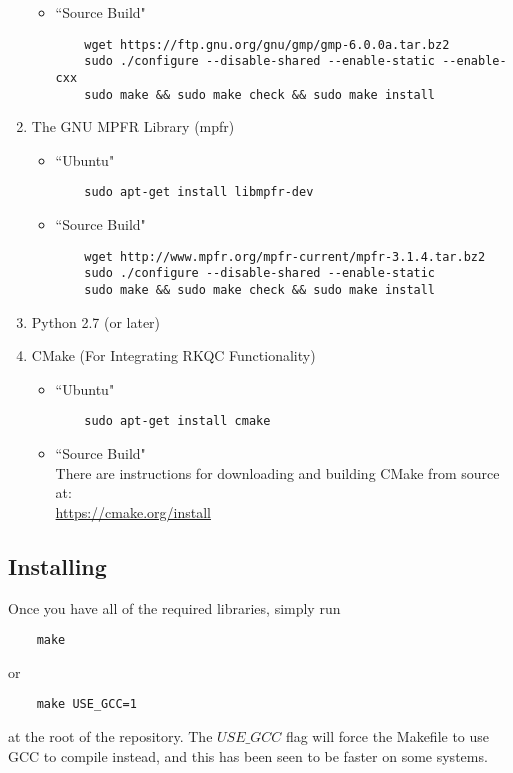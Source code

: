 \begin{enumerate}
\begin{itemize}
    \item ``Source Build"
    \begin{lstlisting}
    wget https://ftp.gnu.org/gnu/gmp/gmp-6.0.0a.tar.bz2
    sudo ./configure --disable-shared --enable-static --enable-cxx
    sudo make && sudo make check && sudo make install
    \end{lstlisting}
  \end{itemize}

  \item The GNU MPFR Library (mpfr)
  \begin{itemize}    
    \item ``Ubuntu"
    \begin{lstlisting}
    sudo apt-get install libmpfr-dev
    \end{lstlisting}

    \item ``Source Build"
    \begin{lstlisting}
    wget http://www.mpfr.org/mpfr-current/mpfr-3.1.4.tar.bz2
    sudo ./configure --disable-shared --enable-static
    sudo make && sudo make check && sudo make install
    \end{lstlisting}
  \end{itemize}

  \item Python 2.7 (or later)

  \item CMake (For Integrating RKQC Functionality)
  \begin{itemize}
    \item ``Ubuntu"
    \begin{lstlisting}
    sudo apt-get install cmake
    \end{lstlisting}

    \item ``Source Build" \\
    There are instructions for downloading and building CMake from source at: \\
    \url{https://cmake.org/install}
  \end{itemize}

\end{enumerate}

\subsection{Installing}

Once you have all of the required libraries, simply run 
\begin{lstlisting}
    make
\end{lstlisting} 
or 
\begin{lstlisting}
    make USE_GCC=1
\end{lstlisting} 
at the root of the repository. The $USE\_GCC$ flag will force the 
Makefile to use GCC to compile instead, and this has been seen to be faster 
on some systems.

